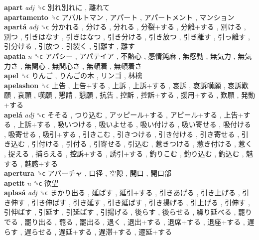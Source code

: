 \textbf{apart} \emph{adj}  ␝ϲ   別れ別れに ,  離れて   \\
\textbf{apartamento} ␝ϲ   アパルトマン ,  アパート ,  アパートメント ,  マンション   \\
\textbf{apartá} \emph{adj}  ␝ϲ   分かれる ,  分ける ,  分れる ,  分裂+する ,  分離+する ,  別ける ,  別つ ,  引きはなす ,  引きはなつ ,  引き分ける ,  引き放つ ,  引き離す ,  引っ離す ,  引分ける ,  引放つ ,  引裂く ,  引離す ,  離す   \\
\textbf{apatia} \emph{n}  ␝ϲ   アパシー ,  アパテイア ,  不熱心 ,  感情鈍麻 ,  無感動 ,  無気力 ,  無気力さ ,  無関心 ,  無関心さ ,  無頓着 ,  無頓着さ   \\
\textbf{apel} ␝ϲ   りんご ,  りんごの木 ,  リンゴ ,  林檎   \\
\textbf{apelashon} ␝ϲ   上告 ,  上告+する ,  上訴 ,  上訴+する ,  哀訴 ,  哀訴嘆願 ,  哀訴歎願 ,  哀願 ,  嘆願 ,  懇請 ,  懇願 ,  抗告 ,  控訴 ,  控訴+する ,  援用+する ,  歎願 ,  発動+する   \\
\textbf{apelá} \emph{adj}  ␝ϲ   そそる ,  つり込む ,  アッピール+する ,  アピール+する ,  上告+する ,  上訴+する ,  吸いつける ,  吸いよせる ,  吸い付ける ,  吸い寄せる ,  吸付ける ,  吸寄せる ,  吸引+する ,  引きこむ ,  引きつける ,  引き付ける ,  引き寄せる ,  引き込む ,  引付ける ,  引付る ,  引寄せる ,  引込む ,  惹きつける ,  惹き付ける ,  惹く ,  捉える ,  捕らえる ,  控訴+する ,  誘引+する ,  釣りこむ ,  釣り込む ,  釣込む ,  魅する ,  魅惑+する   \\
\textbf{apertura} ␝ϲ   アパーチャ ,  口径 ,  空隙 ,  開口 ,  開口部   \\
\textbf{apetit} \emph{n}  ␝ϲ   欲望   \\
\textbf{aplasá} \emph{adj}  ␝ϲ   まかり出る ,  延ばす ,  延引+する ,  引きあげる ,  引き上げる ,  引き伸す ,  引き伸ばす ,  引き延す ,  引き延ばす ,  引き揚げる ,  引上げる ,  引伸す ,  引伸ばす ,  引延す ,  引延ばす ,  引揚げる ,  後らす ,  後らせる ,  繰り延べる ,  罷りでる ,  罷り出る ,  罷る ,  罷出る ,  退く ,  退出+する ,  退席+する ,  退座+する ,  遅らす ,  遅らせる ,  遅延+する ,  遅滞+する ,  遷延+する   \\
